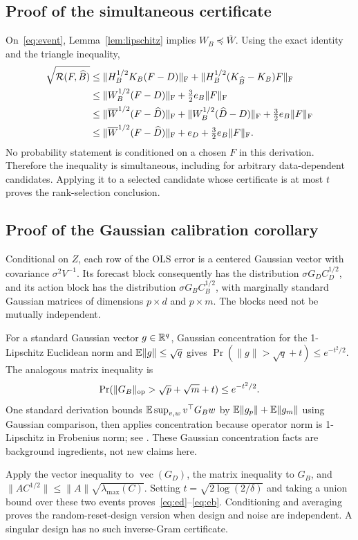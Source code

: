 \subsection{Proof of the simultaneous certificate}
On~\eqref{eq:event}, Lemma~\ref{lem:lipschitz} implies $W_B\preceq\overline W$. Using the exact identity and the triangle inequality,
\begin{align*}
 \sqrt{\mathcal R(F,\widehat B)}
 &\le\|H_B^{1/2}K_B(F-D)\|_\mathrm F
    +\|H_B^{1/2}(K_{\widehat B}-K_B)F\|_\mathrm F\\
 &\le\|W_B^{1/2}(F-D)\|_\mathrm F+\tfrac32e_B\|F\|_\mathrm F\\
 &\le\|\overline W^{1/2}(F-\widehat D)\|_\mathrm F
      +\|W_B^{1/2}(\widehat D-D)\|_\mathrm F+\tfrac32e_B\|F\|_\mathrm F\\
 &\le\|\overline W^{1/2}(F-\widehat D)\|_\mathrm F+e_D+\tfrac32e_B\|F\|_\mathrm F.
\end{align*}
No probability statement is conditioned on a chosen $F$ in this derivation. Therefore the inequality is simultaneous, including for arbitrary data-dependent candidates. Applying it to a selected candidate whose certificate is at most $t$ proves the rank-selection conclusion.

\subsection{Proof of the Gaussian calibration corollary}
Conditional on $Z$, each row of the OLS error is a centered Gaussian vector with covariance $\sigma^2V^{-1}$. Its forecast block consequently has the distribution $\sigma G_D C_D^{1/2}$, and its action block has the distribution $\sigma G_B C_B^{1/2}$, with marginally standard Gaussian matrices of dimensions $p\times d$ and $p\times m$. The blocks need not be mutually independent.

For a standard Gaussian vector $g\in\mathbb R^q$, Gaussian concentration for the 1-Lipschitz Euclidean norm and $\mathbb E\|g\|\le\sqrt q$ gives $\Pr(\|g\|>\sqrt q+t)\le e^{-t^2/2}$. The analogous matrix inequality is
\[
 \Pr(\|G_B\|_{\mathrm{op}}>\sqrt p+\sqrt m+t)\le e^{-t^2/2}.
\]
One standard derivation bounds $\mathbb E\sup_{v,w}v^\top G_Bw$ by $\mathbb E\|g_p\|+\mathbb E\|g_m\|$ using Gaussian comparison, then applies concentration because operator norm is 1-Lipschitz in Frobenius norm; see \citet{vershynin2018}. These Gaussian concentration facts are background ingredients, not new claims here.

Apply the vector inequality to $\operatorname{vec}(G_D)$, the matrix inequality to $G_B$, and $\|AC^{1/2}\|\le\|A\|\sqrt{\lambda_{\max}(C)}$. Setting $t=\sqrt{2\log(2/\delta)}$ and taking a union bound over these two events proves~\eqref{eq:ed}--\eqref{eq:eb}. Conditioning and averaging proves the random-reset-design version when design and noise are independent. A singular design has no such inverse-Gram certificate.

